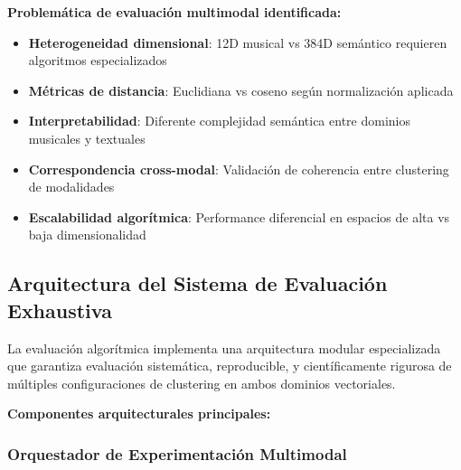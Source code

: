 \documentclass[12pt,a4paper]{report}
\begin{document}
\textbf{Problemática de evaluación multimodal identificada:}
\begin{itemize}
    \item \textbf{Heterogeneidad dimensional}: 12D musical vs 384D semántico requieren algoritmos especializados
    \item \textbf{Métricas de distancia}: Euclidiana vs coseno según normalización aplicada
    \item \textbf{Interpretabilidad}: Diferente complejidad semántica entre dominios musicales y textuales
    \item \textbf{Correspondencia cross-modal}: Validación de coherencia entre clustering de modalidades
    \item \textbf{Escalabilidad algorítmica}: Performance diferencial en espacios de alta vs baja dimensionalidad
\end{itemize}

\subsection{Arquitectura del Sistema de Evaluación Exhaustiva}

La evaluación algorítmica implementa una arquitectura modular especializada que garantiza evaluación sistemática, reproducible, y científicamente rigurosa de múltiples configuraciones de clustering en ambos dominios vectoriales.

\textbf{Componentes arquitecturales principales:}

\subsubsection{Orquestador de Experimentación Multimodal}
\end{document}
